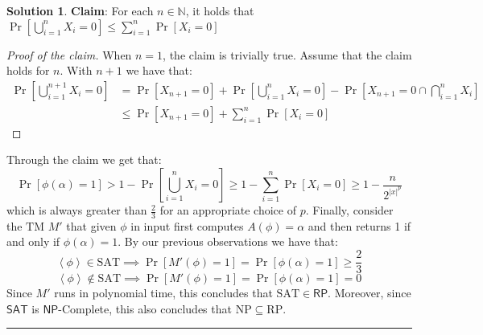 \documentclass[12pt,a4paper]{report}
\theoremstyle{definition}
\newtheorem{solution}{Solution}
\newcommand{\abs}[1]{\left|#1\right|}
\newcommand{\abk}[1]{\left\langle#1\right\rangle}
\begin{document}
\begin{solution}
        \textbf{Claim}: For each $n \in \mathbb{N}$, it holds that $\Pr \left [\bigcup_{i = 1}^n X_i = 0 \right ] \leq \sum_{i = 1}^n \Pr \left [ X_i = 0 \right ]$ 

        \begin{proof}[Proof of the claim]
            When $n = 1$, the claim is trivially true. Assume that the claim holds for $n$. With $n+1$ we have that:
            \[\begin{split}
                \Pr \left [\bigcup_{i = 1}^{n+1} X_i = 0 \right ] &= \Pr[X_{n+1} = 0] + \Pr \left [\bigcup_{i = 1}^n X_i = 0 \right ] - \Pr \left [X_{n+1} = 0 \cap \bigcap_{i = 1}^n X_i \right ]\\
                &\leq \Pr[X_{n+1} = 0] + \sum_{i = 1}^n \Pr [X_i = 0 ]
            \end{split} \]
        \end{proof}

        Through the claim we get that:
        \[\Pr[\phi(\alpha) = 1] > 1 - \Pr \left [\bigcup_{i = 1}^n X_i = 0 \right ] \geq 1 -  \sum_{i = 1}^n \Pr \left [ X_i = 0 \right ] \geq 1 - \frac{n}{2^{{\abs{x}}^p}}\]
        which is always greater than $\frac{2}{3}$ for an appropriate choice of $p$. 
        Finally, consider the $\mathrm{TM}$ $M'$ that given $\phi$ in input first computes $A(\phi) = \alpha$ and then returns 1 if and only if $\phi(\alpha) = 1$. By our previous observations we have that:
        \[\abk{\phi} \in \mathrm{SAT} \implies \Pr[M'(\phi) = 1] = \Pr[\phi(\alpha) = 1] \geq \frac{2}{3}\]
        \[\abk{\phi} \notin \mathrm{SAT} \implies \Pr[M'(\phi) = 1] = \Pr[\phi(\alpha) = 1] = 0\]
        Since $M'$ runs in polynomial time, this concludes that $\mathrm{SAT} \in \mathsf{RP}$. Moreover, since $\mathsf{SAT}$ is $\mathsf{NP}$-Complete, this also concludes that $\mathrm{NP} \subseteq \mathrm{RP}$.
    \end{solution}

    \quad

    \hrule

    \quad
\end{document}
